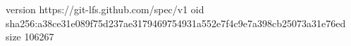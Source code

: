 version https://git-lfs.github.com/spec/v1
oid sha256:a38ce31e089f75d237ae3179469754931a552e7f4c9e7a398cb25073a31e76ed
size 106267
